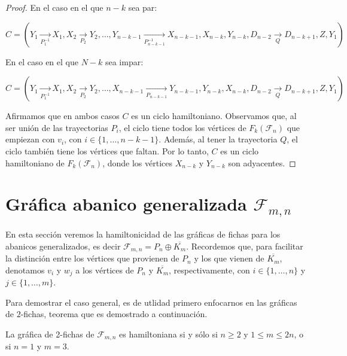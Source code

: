 \begin{proof}
    En el caso en el que $n-k$ sea par:
            
    $C =(Y_1 \xrightarrow[P_1^{-1}]{} X_1, X_2 \xrightarrow[P_2]{} Y_2, \dots,
    Y_{n-k-1} \xrightarrow[P_{n-k-1}^{-1}]{} X_{n-k-1}, X_{n-k}, Y_{n-k},
    D_{n-2} \xrightarrow[Q]{} D_{n-k+1}, Z, Y_1)$
    
    En el caso en el que $N-k$ sea impar:
    
    $C = (Y_1 \xrightarrow[P_1^{-1}]{} X_1, X_2 \xrightarrow[P_2]{} Y_2, \dots,
    X_{n-k-1} \xrightarrow[P_{n-k-1}]{} Y_{n-k-1}, Y_{n-k}, X_{n-k}, D_{n-2}
    \xrightarrow[Q]{} D_{n-k+1}, Z, Y_1)$
    
    Afirmamos que en ambos casos $C$ es un ciclo hamiltoniano. Observamos que,
    al ser uni\'on de las trayectorias $P_i$, el ciclo tiene todos los
    v\'ertices de $F_k(\mathcal{F}_n)$ que empiezan con $v_i$, con $i \in \{1,
    \dots, n-k-1\}$. Adem\'as, al tener la trayectoria $Q$, el ciclo tambi\'en
    tiene los v\'ertices que faltan. Por lo tanto, $C$ es un ciclo hamiltoniano
    de $F_k(\mathcal{F}_n)$, donde los v\'ertices $X_{n-k}$ y $Y_{n-k}$ son
    adyacentes. 

\end{proof}

\section{Gr\'afica abanico generalizada
\texorpdfstring{$\mathcal{F}_{m,n}$}{Fmn}}%
\label{sec:GeneralFan}

En esta secci\'on veremos la hamiltonicidad de las gr\'aficas de fichas para los
abanicos generalizados, es decir $\mathcal{F}_{m,n}=P_n \oplus \overline{K_m}$.
Recordemos que, para facilitar la distinci\'on entre los v\'ertices que
provienen de $P_n$ y los que vienen de $\overline{K_m}$, denotamos $v_i$ y $w_j$
a los v\'ertices de $P_n$ y $\overline{K_m}$, respectivamente, con $i \in \{1,
\dots, n\}$ y $j \in \{1, \dots, m\}$. 

Para demostrar el caso general, es de utlidad primero enfocarnos en las
gr\'aficas de $2$-fichas, teorema que es demostrado a continuaci\'on.

\begin{teorema}
\label{teo:2-TokGenerFan}
    La gr\'afica de 2-fichas de $\mathcal{F}_{m,n}$ es hamiltoniana si y s\'olo
    si $n \geq 2$ y $1 \leq m \leq 2n$, o si $n=1$ y $m=3$.
\end{teorema}


